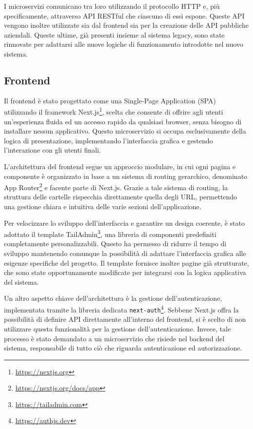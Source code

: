 I microservizi comunicano tra loro utilizzando il protocollo HTTP e, più specificamente, attraverso API RESTful che ciascuno di essi espone. Queste API vengono inoltre utilizzate sia dal frontend sia per la creazione delle API pubbliche aziendali. Queste ultime, già presenti insieme al sistema legacy, sono state rinnovate per adattarsi alle nuove logiche di funzionamento introdotte nel nuovo sistema.

\subsection{Frontend}
Il frontend è stato progettato come una Single-Page Application (SPA) utilizzando il framework Next.js\footnote{\url{https://nextjs.org}}, scelta che consente di offrire agli utenti un'esperienza fluida ed un accesso rapido da qualsiasi browser, senza bisogno di installare nessun applicativo. Questo microservizio si occupa esclusivamente della logica di presentazione, implementando l'interfaccia grafica e gestendo l'interazione con gli utenti finali.

L'architettura del frontend segue un approccio modulare, in cui ogni pagina e componente è organizzato in base a un sistema di routing gerarchico, denominato App Router\footnote{\url{https://nextjs.org/docs/app}} e facente parte di Next.js. Grazie a tale sistema di routing, la struttura delle cartelle rispecchia direttamente quella degli URL, permettendo una gestione chiara e intuitiva delle varie sezioni dell’applicazione.

Per velocizzare lo sviluppo dell'interfaccia e garantire un design coerente, è stato adottato il template TailAdmin\footnote{\url{https://tailadmin.com}}, una libreria di componenti predefiniti completamente personalizzabili. Questo ha permesso di ridurre il tempo di sviluppo mantenendo comunque la possibilità di adattare l’interfaccia grafica alle esigenze specifiche del progetto. Il template fornisce inoltre pagine già strutturate, che sono state opportunamente modificate per integrarsi con la logica applicativa del sistema.

Un altro aspetto chiave dell'architettura è la gestione dell'autenticazione, implementata tramite la libreria dedicata \texttt{next-auth}\footnote{\url{https://authjs.dev}}. Sebbene Next.js offra la possibilità di definire API direttamente all'interno del frontend, si è scelto di non utilizzare questa funzionalità per la gestione dell'autenticazione. Invece, tale processo è stato demandato a un microservizio che risiede nel backend del sistema, responsabile di tutto ciò che riguarda autenticazione ed autorizzazione.

